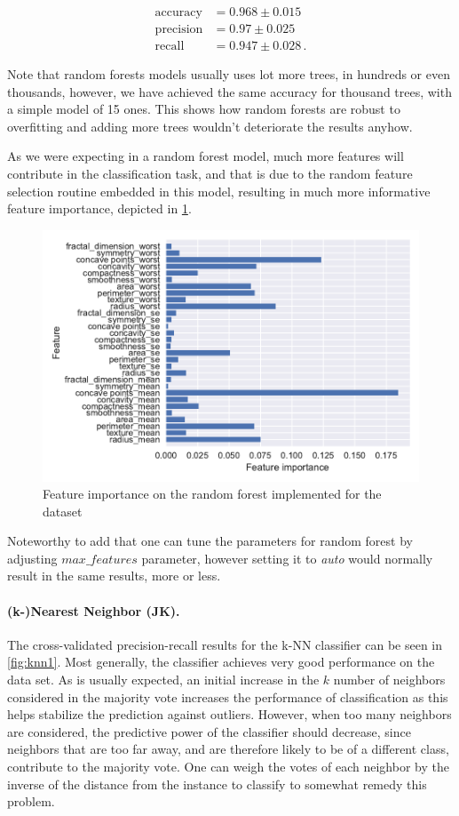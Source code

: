 \documentclass[12pt, a4paper]{scrartcl}
\begin{document}
\begin{align*}
	\text{accuracy} &= 0.968 \pm 0.015 \\
	\text{precision} &= 0.97 \pm 0.025 \\
	\text{recall} &= 0.947 \pm 0.028 \, .
\end{align*}

Note that random forests models usually uses lot more trees, in hundreds or even thousands, however, we have achieved the same accuracy for thousand trees, with a simple model of 15 ones. This shows how random forests are robust to overfitting and adding more trees wouldn't deteriorate the results anyhow. 

As we were expecting in a random forest model, much more features will contribute in the classification task, and that is due to the random feature selection routine embedded in this model, resulting in much more informative feature importance, depicted in \cref{fig:feature_importance_rf}.

\begin{figure}[h]
	\centering
	\includegraphics[width=.6\textwidth]{feature_importance_rf}
	\caption{Feature importance on the random forest implemented for the dataset}
	\label{fig:feature_importance_rf}
\end{figure}

Noteworthy to add that one can tune the parameters for random forest by adjusting \emph{$max\_features$} parameter, however setting it to \emph{auto} would normally result in the same results, more or less.

\paragraph{(k-)Nearest Neighbor (JK).} The cross-validated precision-recall results for the k-NN classifier can be seen in \cref{fig:knn1}. Most generally, the classifier achieves very good performance on the data set.
As is usually expected, an initial increase in the $k$ number of neighbors considered in the majority vote increases the performance of classification as this helps stabilize the prediction against outliers. However, when too many neighbors are considered, the predictive power of the classifier should decrease, since neighbors that are too far away, and are therefore likely to be of a different class, contribute to the majority vote. One can weigh the votes of each neighbor by the inverse of the distance from the instance to classify to somewhat remedy this problem.
\end{document}
